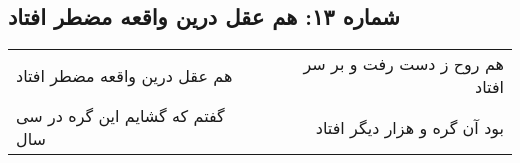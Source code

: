 \begin{center}
\section*{شماره ۱۳: هم عقل درین واقعه مضطر افتاد}
\label{sec:013}
\begin{longtable}{l p{0.5cm} r}
هم عقل درین واقعه مضطر افتاد
&&
هم روح ز دست رفت و بر سر افتاد
\\
گفتم که گشایم این گره در سی سال
&&
بود آن گره و هزار دیگر افتاد
\\
\end{longtable}
\end{center}
